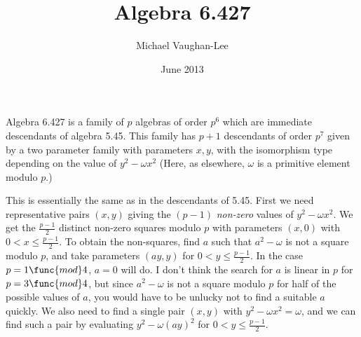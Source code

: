 \documentclass[12pt]{article}
\begin{document}
\title{Algebra 6.427}
\author{Michael Vaughan-Lee}
\date{June 2013}
\maketitle

Algebra 6.427 is a family of $p$ algebras of order $p^{6}$ which are
immediate descendants of algebra 5.45. This family has $p+1$ descendants of
order $p^{7}$ given by a two parameter family with parameters $x,y$, with
the isomorphism type depending on the value of $y^{2}-\omega x^{2}$ (Here,
as elsewhere, $\omega $ is a primitive element modulo $p$.)

This is essentially the same as in the descendants of 5.45. First we need
representative pairs $(x,y)$ giving the $(p-1)$ \emph{non-zero} values of $%
y^{2}-\omega x^{2}$. We get the $\frac{p-1}{2}$ distinct non-zero squares
modulo $p$ with parameters $(x,0)$ with $0<x\leq \frac{p-1}{2}$. To obtain
the non-squares, find $a$ such that $a^{2}-\omega $ is not a square modulo $p
$, and take parameters $(ay,y)$ for $0<y\leq \frac{p-1}{2}$. In the case $p=1%
\func{mod}4$, $a=0$ will do. I don't think the search for $a$ is linear in $p
$ for $p=3\func{mod}4$, but since $a^{2}-\omega $ is not a square modulo $p$
for half of the possible values of $a$, you would have to be unlucky not to
find a suitable $a$ quickly. We also need to find a single pair $(x,y)$ with 
$y^{2}-\omega x^{2}=\omega $, and we can find such a pair by evaluating $%
y^{2}-\omega (ay)^{2}$ for $0<y\leq \frac{p-1}{2}$.
\end{document}
